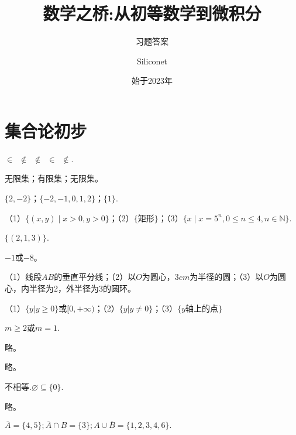\documentclass[lang=cn,newtx,10pt,scheme=chinese]{elegantbook}
\title{数学之桥:从初等数学到微积分}
\subtitle{习题答案}
\author{Siliconet}
\date{始于2023年}
\begin{document}
\maketitle
\frontmatter

\tableofcontents

\mainmatter

\chapter{集合论初步}
\begin{exercise}
  $\in\enspace\notin\enspace\notin\enspace\in\enspace\notin$.
\end{exercise}
\begin{exercise}
  无限集；有限集；无限集。
\end{exercise}
\begin{exercise}
  $\{2,-2\}$；$\{-2,-1,0,1,2\}$；$\{1\}$.
\end{exercise}
\begin{exercise}
  （1）$\{(x,y)\mid x>0,y>0\}$；（2）$\{\text{矩形}\}$；（3）$\{x\mid x=5^n,0\leq n\leq 4,n\in\mathbb{N}\}$.
\end{exercise}
\begin{exercise}
  $\{(2,1,3)\}$.
\end{exercise}
\begin{exercise}
  $-1$或$-8$。
\end{exercise}
\begin{exercise}
  （1）线段$AB$的垂直平分线；（2）以$O$为圆心，$3cm$为半径的圆；（3）以$O$为圆心，内半径为2，外半径为3的圆环。
\end{exercise}
\begin{exercise}
  （1）$\{y|y\geqslant0\}$或$[0,+\infty)$；（2）$\{y|y\neq0\}$；（3）$\{y\text{轴上的点}\}$
\end{exercise}
\begin{exercise}
  $m\geqslant2\text{或}m=1$.
\end{exercise}
\begin{exercise}
  略。
\end{exercise}
\begin{exercise}
  略。
\end{exercise}
\begin{exercise}
  不相等.$\varnothing\subseteq\{0\}.$
\end{exercise}
\begin{exercise}
  略。
\end{exercise}
\begin{exercise}
  $\overline{A}=\{4,5\};\overline{A}\cap B=\{3\};A\cup\overline{B}=\{1,2,3,4,6\}.$
\end{exercise}
\end{document}
